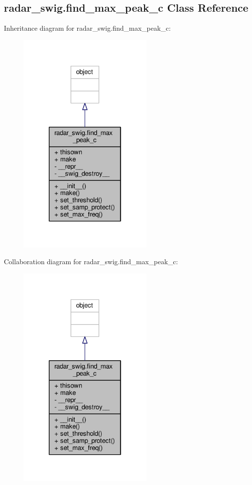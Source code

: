 \subsection{radar\+\_\+swig.\+find\+\_\+max\+\_\+peak\+\_\+c Class Reference}
\label{classradar__swig_1_1find__max__peak__c}


Inheritance diagram for radar\+\_\+swig.\+find\+\_\+max\+\_\+peak\+\_\+c\+:
\nopagebreak
\begin{figure}[H]
\begin{center}
\leavevmode
\includegraphics[width=190pt]{d1/d6b/classradar__swig_1_1find__max__peak__c__inherit__graph}
\end{center}
\end{figure}


Collaboration diagram for radar\+\_\+swig.\+find\+\_\+max\+\_\+peak\+\_\+c\+:
\nopagebreak
\begin{figure}[H]
\begin{center}
\leavevmode
\includegraphics[width=190pt]{da/d03/classradar__swig_1_1find__max__peak__c__coll__graph}
\end{center}
\end{figure}

